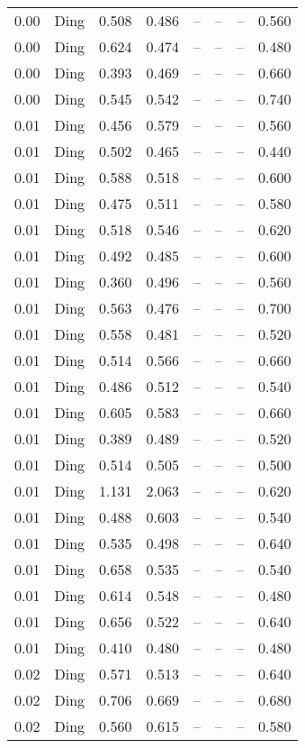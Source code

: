 \begin{table}[H]
\begin{tabular}{l c l l l}
0.00 & Ding & 0.508 & 0.486 & -- & -- & -- & 0.560 \\
0.00 & Ding & 0.624 & 0.474 & -- & -- & -- & 0.480 \\
0.00 & Ding & 0.393 & 0.469 & -- & -- & -- & 0.660 \\
0.00 & Ding & 0.545 & 0.542 & -- & -- & -- & 0.740 \\
0.01 & Ding & 0.456 & 0.579 & -- & -- & -- & 0.560 \\
0.01 & Ding & 0.502 & 0.465 & -- & -- & -- & 0.440 \\
0.01 & Ding & 0.588 & 0.518 & -- & -- & -- & 0.600 \\
0.01 & Ding & 0.475 & 0.511 & -- & -- & -- & 0.580 \\
0.01 & Ding & 0.518 & 0.546 & -- & -- & -- & 0.620 \\
0.01 & Ding & 0.492 & 0.485 & -- & -- & -- & 0.600 \\
0.01 & Ding & 0.360 & 0.496 & -- & -- & -- & 0.560 \\
0.01 & Ding & 0.563 & 0.476 & -- & -- & -- & 0.700 \\
0.01 & Ding & 0.558 & 0.481 & -- & -- & -- & 0.520 \\
0.01 & Ding & 0.514 & 0.566 & -- & -- & -- & 0.660 \\
0.01 & Ding & 0.486 & 0.512 & -- & -- & -- & 0.540 \\
0.01 & Ding & 0.605 & 0.583 & -- & -- & -- & 0.660 \\
0.01 & Ding & 0.389 & 0.489 & -- & -- & -- & 0.520 \\
0.01 & Ding & 0.514 & 0.505 & -- & -- & -- & 0.500 \\
0.01 & Ding & 1.131 & 2.063 & -- & -- & -- & 0.620 \\
0.01 & Ding & 0.488 & 0.603 & -- & -- & -- & 0.540 \\
0.01 & Ding & 0.535 & 0.498 & -- & -- & -- & 0.640 \\
0.01 & Ding & 0.658 & 0.535 & -- & -- & -- & 0.540 \\
0.01 & Ding & 0.614 & 0.548 & -- & -- & -- & 0.480 \\
0.01 & Ding & 0.656 & 0.522 & -- & -- & -- & 0.640 \\
0.01 & Ding & 0.410 & 0.480 & -- & -- & -- & 0.480 \\
0.02 & Ding & 0.571 & 0.513 & -- & -- & -- & 0.640 \\
0.02 & Ding & 0.706 & 0.669 & -- & -- & -- & 0.680 \\
0.02 & Ding & 0.560 & 0.615 & -- & -- & -- & 0.580 \\

\end{tabular}
\end{table}
